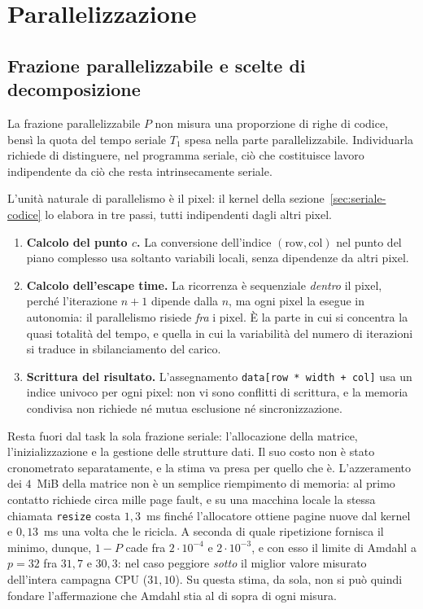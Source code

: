 \section{Parallelizzazione}
\label{sec:parallelizzazione}
\subsection{Frazione parallelizzabile e scelte di decomposizione}

La frazione parallelizzabile $P$ non misura una proporzione di righe di codice,
bensì la quota del tempo seriale $T_1$ spesa nella parte parallelizzabile.
Individuarla richiede di distinguere, nel programma seriale, ciò che costituisce
lavoro indipendente da ciò che resta intrinsecamente seriale.

L'unità naturale di parallelismo è il pixel: il kernel della
sezione~\ref{sec:seriale-codice} lo elabora in tre passi, tutti indipendenti
dagli altri pixel.
\begin{enumerate}
  \item \textbf{Calcolo del punto $c$.} La conversione dell'indice
  $(\text{row}, \text{col})$ nel punto del piano complesso usa soltanto variabili
  locali, senza dipendenze da altri pixel.
  \item \textbf{Calcolo dell'escape time.} La ricorrenza è sequenziale
  \emph{dentro} il pixel, perché l'iterazione $n+1$ dipende dalla $n$, ma ogni
  pixel la esegue in autonomia: il parallelismo risiede \emph{fra} i pixel. È la
  parte in cui si concentra la quasi totalità del tempo, e quella in cui la
  variabilità del numero di iterazioni si traduce in sbilanciamento del carico.
  \item \textbf{Scrittura del risultato.} L'assegnamento
  \verb|data[row * width + col]| usa un indice univoco per ogni pixel: non vi
  sono conflitti di scrittura, e la memoria condivisa non richiede né mutua
  esclusione né sincronizzazione.
\end{enumerate}

Resta fuori dal task la sola frazione seriale: l'allocazione della matrice,
l'inizializzazione e la gestione delle strutture dati. Il suo costo non è stato
cronometrato separatamente, e la stima va presa per quello che è. L'azzeramento
dei $4$~MiB della matrice non è un semplice riempimento di memoria: al primo
contatto richiede circa mille page fault, e su una macchina locale la stessa
chiamata \texttt{resize} costa $1{,}3$~ms finché l'allocatore ottiene pagine
nuove dal kernel e $0{,}13$~ms una volta che le ricicla. A seconda di quale
ripetizione fornisca il minimo, dunque, $1-P$ cade fra $2\cdot10^{-4}$ e
$2\cdot10^{-3}$, e con esso il limite di Amdahl a $p=32$ fra $31{,}7$ e
$30{,}3$: nel caso peggiore \emph{sotto} il miglior valore misurato dell'intera
campagna CPU ($31{,}10$). Su questa stima, da sola, non si può quindi fondare
l'affermazione che Amdahl stia al di sopra di ogni misura.

